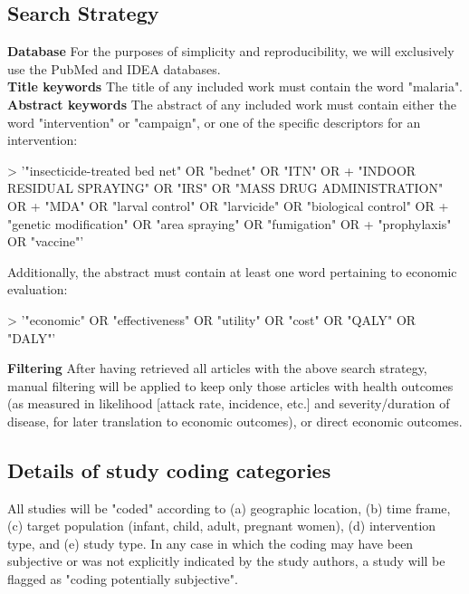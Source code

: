 \documentclass{article}
\begin{document}
\subsection*{Search Strategy}

\noindent \textbf{Database} For the purposes of simplicity and reproducibility, we will exclusively use the PubMed and IDEA databases. \\

\noindent \textbf{Title keywords} The title of any included work must contain the word "malaria". \\

\noindent \textbf{Abstract keywords} The abstract of any included work must contain either the word "intervention" or "campaign", or one of the specific descriptors for an intervention:  

\begin{Schunk}
\begin{Sinput}
> '"insecticide-treated bed net" OR "bednet" OR "ITN" OR 
+ "INDOOR RESIDUAL SPRAYING" OR "IRS" OR "MASS DRUG ADMINISTRATION" OR 
+ "MDA" OR "larval control" OR "larvicide" OR "biological control" OR 
+ "genetic modification" OR "area spraying" OR "fumigation" OR 
+ "prophylaxis" OR "vaccine"'
\end{Sinput}
\end{Schunk}

Additionally, the abstract must contain at least one word pertaining to economic evaluation:

\begin{Schunk}
\begin{Sinput}
> '"economic" OR "effectiveness" OR "utility" OR "cost" OR "QALY" OR "DALY"'
\end{Sinput}
\end{Schunk}

\noindent \textbf{Filtering} After having retrieved all articles with the above search strategy, manual filtering will be applied to keep only those articles with health outcomes (as measured in likelihood [attack rate, incidence, etc.] and severity/duration of disease, for later translation to economic outcomes), or direct economic outcomes.

\subsection*{Details of study coding categories} 

All studies will be "coded" according to (a) geographic location, (b) time frame, (c) target population (infant, child, adult, pregnant women), (d) intervention type, and (e) study type. In any case in which the coding may have been subjective or was not explicitly indicated by the study authors, a study will be flagged as "coding potentially subjective".
\end{document}

